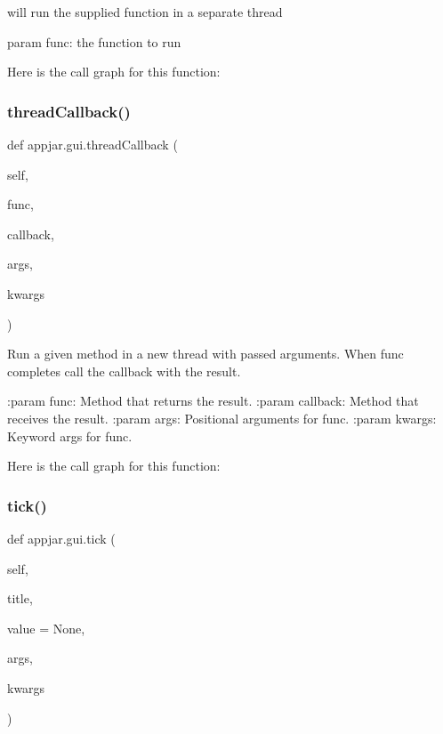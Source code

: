 \begin{DoxyVerb}
\begin{DoxyVerb}will run the supplied function in a separate thread

param func: the function to run
\end{DoxyVerb}
 Here is the call graph for this function\+:
\mbox{\label{classappjar_1_1gui_a5eea471867fa8c775a474c34181abad3}} 
\subsubsection{\texorpdfstring{thread\+Callback()}{threadCallback()}}
{\footnotesize\ttfamily def appjar.\+gui.\+thread\+Callback (\begin{DoxyParamCaption}\item[{}]{self,  }\item[{}]{func,  }\item[{}]{callback,  }\item[{}]{args,  }\item[{}]{kwargs }\end{DoxyParamCaption})}

\begin{DoxyVerb}Run a given method in a new thread with passed arguments.
   When func completes call the callback with the result.

   :param func: Method that returns the result.
   :param callback: Method that receives the result.
   :param args: Positional arguments for func.
   :param kwargs: Keyword args for func.
\end{DoxyVerb}
 Here is the call graph for this function\+:
\mbox{\label{classappjar_1_1gui_ab98fbb5e6c2e23f49a2b6d02927fb347}} 
\subsubsection{\texorpdfstring{tick()}{tick()}}
{\footnotesize\ttfamily def appjar.\+gui.\+tick (\begin{DoxyParamCaption}\item[{}]{self,  }\item[{}]{title,  }\item[{}]{value = {\ttfamily None},  }\item[{}]{args,  }\item[{}]{kwargs }\end{DoxyParamCaption})}




\end{DoxyVerb}
